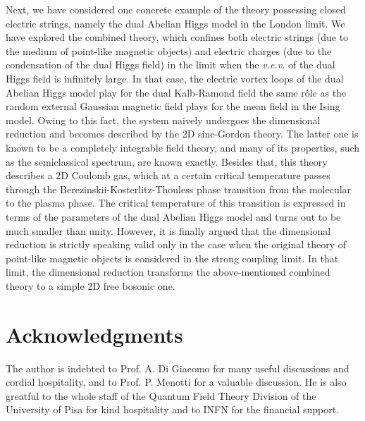 \documentclass[a4paper,12pt]{article}
\begin{document}
Next, we have considered one concrete example 
of the theory possessing closed electric strings, namely the dual Abelian Higgs model in the London limit. We have explored the 
combined theory, which confines both electric strings (due to the medium of point-like magnetic objects) and electric 
charges (due to the condensation of the dual Higgs field) in the limit when the {\it v.e.v.} of the dual Higgs field is 
infinitely large. In that case, the electric vortex loops of the dual Abelian Higgs model play for the dual Kalb-Ramond field
the same r\^ole as the random external Gaussian magnetic field plays for the mean field in the Ising model. Owing to this fact,
the system naively undergoes the dimensional reduction and becomes described by the 2D sine-Gordon theory. The latter one is known 
to be a completely integrable field theory, and many of its properties, such as the semiclassical spectrum, are known exactly.
Besides that, this theory describes a 2D Coulomb gas, which at a certain critical temperature passes through the 
Berezinskii-Kosterlitz-Thouless phase transition from the molecular to the plasma phase. The critical temperature 
of this transition is expressed in terms of the parameters of the dual Abelian Higgs model and turns out to be 
much smaller than unity. However, it is finally argued that the dimensional reduction is strictly speaking valid only in the 
case when the original theory of point-like magnetic objects is considered in the strong coupling limit. In that limit, the dimensional
reduction transforms the above-mentioned combined theory to a simple 2D free bosonic one.





\section*{Acknowledgments}
The author is indebted to Prof. A. Di Giacomo for many useful discussions and 
cordial hospitality, and to Prof. P. Menotti for a valuable discussion. He is also 
greatful to the whole staff of the Quantum Field Theory Division
of the University of Pisa for kind hospitality and to INFN for the financial support. 




 
\end{document}
